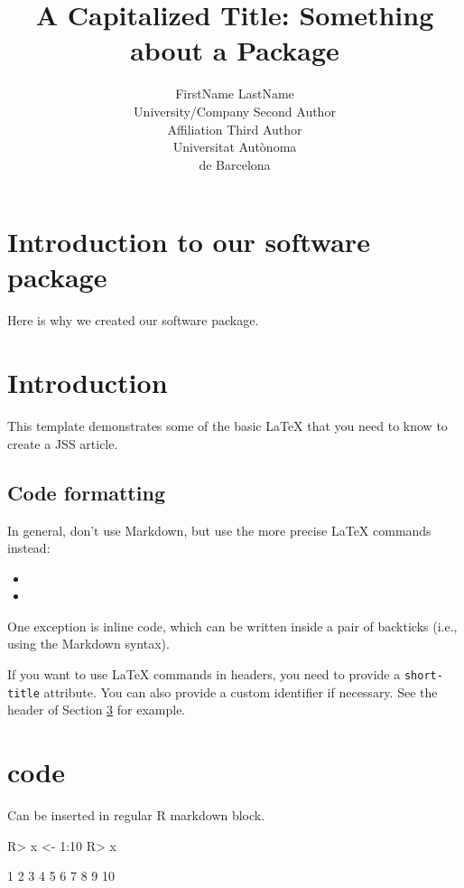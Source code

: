 \documentclass[
]{jss}
\author{
FirstName LastName\\University/Company \And Second Author\\Affiliation
\AND Third Author\\Universitat Autònoma\\
de Barcelona
}
\title{A Capitalized Title: Something about a Package \pkg{foo}}
\begin{document}
\hypertarget{introduction-to-our-software-package}{%
\section{Introduction to our software
package}\label{introduction-to-our-software-package}}

Here is why we created our software package.

\hypertarget{introduction}{%
\section{Introduction}\label{introduction}}

This template demonstrates some of the basic LaTeX that you need to know
to create a JSS article.

\hypertarget{code-formatting}{%
\subsection{Code formatting}\label{code-formatting}}

In general, don't use Markdown, but use the more precise LaTeX commands
instead:

\begin{itemize}
\item
\item
\end{itemize}

One exception is inline code, which can be written inside a pair of
backticks (i.e., using the Markdown syntax).

If you want to use LaTeX commands in headers, you need to provide a
\texttt{short-title} attribute. You can also provide a custom identifier
if necessary. See the header of Section \ref{r-code} for example.

\section[R code]{ code}\label{r-code}

Can be inserted in regular R markdown block.

\begin{CodeChunk}
\begin{CodeInput}
R> x <- 1:10
R> x
\end{CodeInput}
\begin{CodeOutput}
 [1]  1  2  3  4  5  6  7  8  9 10
\end{CodeOutput}
\end{CodeChunk}
\end{document}
